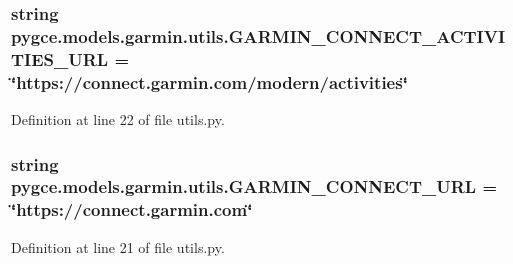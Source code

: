 \subsubsection[{\texorpdfstring{G\+A\+R\+M\+I\+N\+\_\+\+C\+O\+N\+N\+E\+C\+T\+\_\+\+A\+C\+T\+I\+V\+I\+T\+I\+E\+S\+\_\+\+U\+RL}{GARMIN_CONNECT_ACTIVITIES_URL}}]{\setlength{\rightskip}{0pt plus 5cm}string pygce.\+models.\+garmin.\+utils.\+G\+A\+R\+M\+I\+N\+\_\+\+C\+O\+N\+N\+E\+C\+T\+\_\+\+A\+C\+T\+I\+V\+I\+T\+I\+E\+S\+\_\+\+U\+RL = \char`\"{}https\+://connect.\+garmin.\+com/modern/activities\char`\"{}}\hypertarget{namespacepygce_1_1models_1_1garmin_1_1utils_a147f822f3288cb74ff6012414e346e6f}{}\label{namespacepygce_1_1models_1_1garmin_1_1utils_a147f822f3288cb74ff6012414e346e6f}


Definition at line 22 of file utils.\+py.

\subsubsection[{\texorpdfstring{G\+A\+R\+M\+I\+N\+\_\+\+C\+O\+N\+N\+E\+C\+T\+\_\+\+U\+RL}{GARMIN_CONNECT_URL}}]{\setlength{\rightskip}{0pt plus 5cm}string pygce.\+models.\+garmin.\+utils.\+G\+A\+R\+M\+I\+N\+\_\+\+C\+O\+N\+N\+E\+C\+T\+\_\+\+U\+RL = \char`\"{}https\+://connect.\+garmin.\+com\char`\"{}}\hypertarget{namespacepygce_1_1models_1_1garmin_1_1utils_a68b54ed8a5dee0f2fdb43d107f19699f}{}\label{namespacepygce_1_1models_1_1garmin_1_1utils_a68b54ed8a5dee0f2fdb43d107f19699f}


Definition at line 21 of file utils.\+py.

